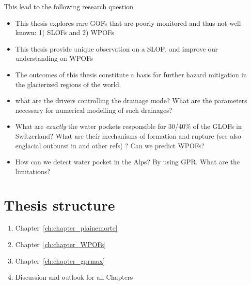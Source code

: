 This lead to the following research question


\begin{itemize}
   \item This thesis explores rare GOFs that are poorly monitored and thus not well known: 1) SLOFs and 2) WPOFs
    \item This thesis provide unique observation on a SLOF, and improve our understanding on WPOFs 
    \item The outcomes of this thesis constitute a basis for further hazard mitigation in the glacierized regions of the world.
    \item  what are the drivers controlling the drainage mode? What are the parameters necessary for numerical modelling of such drainages?
    \item What are \textit{exactly} the water pockets responsible for 30/40\% of the GLOFs in Switzerland? What are their mechanisms of formation and rupture (see also englacial outburst in \cite{Korup&Tweed2007} and other refs) ? Can we predict WPOFs?
    \item  How can we detect water pocket in the Alps? By using GPR. What are the limitations?
\end{itemize}

\section{Thesis structure}


\begin{enumerate}
\item Chapter~\ref{ch:chapter_plainemorte}
\item Chapter~\ref{ch:chapter_WPOFs}
\item Chapter~\ref{ch:chapter_gprmax}
\item Discussion and outlook for all Chapters
\end{enumerate}


